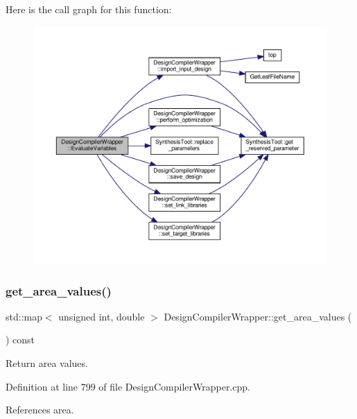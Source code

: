 Here is the call graph for this function\+:
\nopagebreak
\begin{figure}[H]
\begin{center}
\leavevmode
\includegraphics[width=350pt]{d5/d55/classDesignCompilerWrapper_aab1d39b4695cbed4825c1154118e1bef_cgraph}
\end{center}
\end{figure}
\mbox{\label{classDesignCompilerWrapper_ac746e21a0c2859cf60a7c06b691fabe2}} 
\subsubsection{\texorpdfstring{get\+\_\+area\+\_\+values()}{get\_area\_values()}}
{\footnotesize\ttfamily std\+::map$<$ unsigned int, double $>$ Design\+Compiler\+Wrapper\+::get\+\_\+area\+\_\+values (\begin{DoxyParamCaption}{ }\end{DoxyParamCaption}) const}



Return area values. 



Definition at line 799 of file Design\+Compiler\+Wrapper.\+cpp.



References area.

\mbox{\label{classDesignCompilerWrapper_a803583634fb9471246a45af96a40da01}} 

